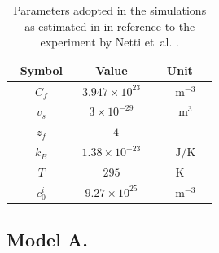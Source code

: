 \documentclass[runningheads]{llncs}
\begin{document}
\begin{table}[h!]
	\vspace{4mm}
	\centering
	\begin{tabular}{||c c c||}
		\hline\addlinespace[2pt]
		Symbol  & Value& Unit\\
		\hline\addlinespace[5pt]
		$\qquad C_f\qquad$  & $3.947\times 10^{23}$& $\qquad\text{m}^{-3}\quad$\\
		$\qquad v_s\qquad$  & $3\times 10^{-29}$& $\qquad\text{m}^3\quad$ \\
		$\qquad z_f\qquad$ & $-4$& -\\
		$\qquad k_B\qquad$ & $1.38 \times 10^{-23}$& $\qquad\text{J}/\text{K}\quad$\\
		$\qquad T\qquad$ &$295$ &K\\
		$\qquad c^i_0\qquad$ & $9.27\times 10^{25}$& $\qquad\text{m}^{-3}\quad$\\
		\hline
	\end{tabular}
	\vspace{2mm}
	\caption{Parameters adopted in the simulations as estimated in \cite{ecm2} in reference to the experiment by Netti et~al. \cite{Netti}.}
	\label{Tab1}
\end{table}

\subsection{Model A.}
\end{document}
